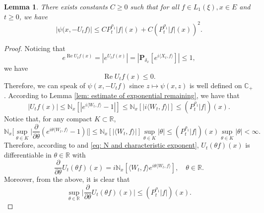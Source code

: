 \documentclass[12pt,a4paper]{amsart}
\theoremstyle{plain}
\newtheorem{lem}[thm]{Lemma}
\theoremstyle{definition}
\numberwithin{equation}{section}
\begin{document}
\begin{lem}
    There exists constants $C\geq 0$ such that for all $f \in L_1(\xi),x\in E$ and $t\geq 0$, we have
\begin{equation}
\label{eq: upper bound of psi(v)}
    \big|\psi\big(x,-U_tf\big)\big|
    \leq C P^{\rho_1}_t |f|(x)+
         C (P^{\rho_1}_t |f| (x))^2.
\end{equation}
\end{lem}
\begin{proof}
     Noticing that
\[
    e^{\operatorname{Re} U_tf(x)}
    = |e^{U_tf(x)}|
    = |\mathbf P_{\delta_x}[e^{i \langle X_t, f\rangle}]|
    \leq 1,
\]
    we have
\begin{equation}
\label{eq: -v has positive real part}
 \operatorname{Re} U_tf(x)
    \leq 0.
\end{equation}
    Therefore, we can speak of $\psi(x,-U_tf)$ since $z\mapsto \psi(x,z)$ is well defined on $\mathbb C_+$.
    According to Lemma \ref{lem: estimate of exponential remaining}, we have that
\begin{equation}
\label{eq: upper bound for vf}
    |U_tf(x)| \leq \mathbb N_x[|e^{i \langle W_t, f\rangle} - 1|]
    \leq \mathbb N_x[|i \langle W_t, f\rangle|]
    \leq (P^{\rho_1}_t |f|)(x).
\end{equation}
    Notice that, for any compact $K \subset \mathbb R$,
\begin{equation}
\label{eq: estimate of deriavetive of v(theta)}
    \mathbb N_x\Big[\sup_{\theta \in K} \Big|\frac{\partial}{\partial \theta} (e^{i\theta \langle W_t, f\rangle} - 1) \Big|\Big]
    \leq \mathbb N_x[|\langle W_t, f\rangle|] \sup_{\theta \in K}|\theta|
    \leq (P^{\rho_1}_t |f|)(x) \sup_{\theta \in K}|\theta| < \infty.
\end{equation}
    Therefore, according to \cite[Theorem A.5.2]{Durrett2010Probability} and \eqref{eq: N and characteristic exponent},
    $U_t(\theta f)(x)$ is differentiable in $\theta \in \mathbb R$ with
\[
    \frac{\partial}{\partial \theta} U_t(\theta f)(x)
    = i\mathbb N_x[\langle W_t, f\rangle e^{i\theta \langle W_t, f\rangle}],
    \quad \theta \in \mathbb R.
\]
    Moreover, from the above, it is clear that
\begin{equation}
\label{eq: upper bounded for derivative of v(theta)}
    \sup_{\theta \in \mathbb R}\Big| \frac{\partial}{\partial \theta}U_t(\theta f)(x)\Big|
    \leq ( P^{\rho_1}_t |f|)(x).
\end{equation}

\end{proof}
\end{document}
